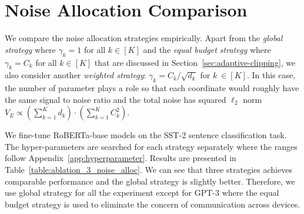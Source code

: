 \section{Noise Allocation Comparison} \label{app:noise-allocation}

We compare the noise allocation strategies empirically. Apart from the \emph{global strategy} where $\gamma_k =1 $ for all $k\in [K]$ and the \emph{equal budget strategy} where $\gamma_k=C_k$ for all $k\in [K]$ that are discussed in Section~\ref{sec:adaptive-clipping}, we also consider another \emph{weighted strategy}: $\gamma_k = C_k/\sqrt{d_k}$ for $k\ \in [K]$. In this case,  the number of parameter plays a role so that each coordinate would roughly have the same signal to noise ratio and the total noise has squared $\ell_2$ norm $V_{E}\propto (\sum_{k=1}^{K}d_{k})\cdot (\sum_{k=1}^{K}C_k^{2})$.

We fine-tune RoBERTa-base models on the SST-2 sentence classification task. The hyper-parameters are searched for each strategy separately where the ranges follow Appendix~\ref{app:hyperparameter}. Results are presented in Table~\ref{table:ablation_3_noise_alloc}. We can see that three strategies achieves comparable performance and the global strategy is slightly better. Therefore, we use global strategy for all the experiment except for GPT-3 where  the equal budget strategy is used to eliminate the concern of communication across devices.
 